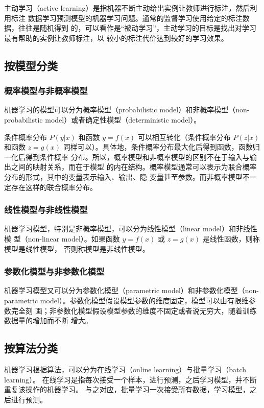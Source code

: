 \begin{definition}[主动学习]
    主动学习（active learning）是指机器不断主动给出实例让教师进行标注，然后利用标注
    数据学习预测模型的机器学习问题。通常的监督学习使用给定的标注数据，往往是随机得到
    的，可以看作是“被动学习”，主动学习的目标是找出对学习最有帮助的实例让教师标注，以
    较小的标注代价达到较好的学习效果。
\end{definition}

\subsection{按模型分类}
\subsubsection*{概率模型与非概率模型}
机器学习的模型可以分为概率模型（probabilistic model）和非概率模型（non-probabilistic
model）或者确定性模型（deterministic model）。

条件概率分布 $P(y|x)$ 和函数 $y = f(x)$ 可以相互转化（条件概率分布 $P(z|x)$ 和函数
$z = g(x)$ 同样可以）。具体地，条件概率分布最大化后得到函数，函数归一化后得到条件概率
分布。所以，概率模型和非概率模型的区别不在于输入与输出之间的映射关系，而在于模型
的内在结构。概率模型通常可以表示为联合概率分布的形式，其中的变量表示输入、输出、隐
变量甚至参数。而非概率模型不一定存在这样的联合概率分布。

\subsubsection*{线性模型与非线性模型}
机器学习模型，特别是非概率模型，可以分为线性模型（linear model）和非线性模
型（non-linear model）。如果函数 $y = f(x)$ 或 $z = g(x)$ 是线性函数，则称模型是线性模型，
否则称模型是非线性模型。

\subsubsection*{参数化模型与非参数化模型}
机器学习模型又可以分为参数化模型（parametric model）和非参数化模型（non-parametric model）。参数化模型假设模型参数的维度固定，模型可以由有限维参数完全刻
画；非参数化模型假设模型参数的维度不固定或者说无穷大，随着训练数据量的增加而不断
增大。

\subsection{按算法分类}
机器学习根据算法，可以分为在线学习（online learning）与批量学习（batch learning）。
在线学习是指每次接受一个样本，进行预测，之后学习模型，并不断重复该操作的机器学习。
与之对应，批量学习一次接受所有数据，学习模型，之后进行预测。

